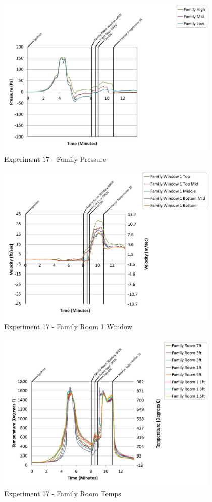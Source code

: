 \documentclass{article}
\begin{document}
\begin{appendices}
	\clearpage

	\begin{figure}[h!]
		\centering
		\includegraphics[height=3.05in]{0_Images/Results_Charts/Exp_17_Charts/FamilyPressure.pdf}
		\caption{Experiment 17 - Family Pressure}
	\end{figure}
 

	\begin{figure}[h!]
		\centering
		\includegraphics[height=3.05in]{0_Images/Results_Charts/Exp_17_Charts/FamilyRoom1Window.pdf}
		\caption{Experiment 17 - Family Room 1 Window}
	\end{figure}
 
	\clearpage

	\begin{figure}[h!]
		\centering
		\includegraphics[height=3.05in]{0_Images/Results_Charts/Exp_17_Charts/FamilyRoomTemps.pdf}
		\caption{Experiment 17 - Family Room Temps}
	\end{figure}
 


\end{appendices}
\end{document}
